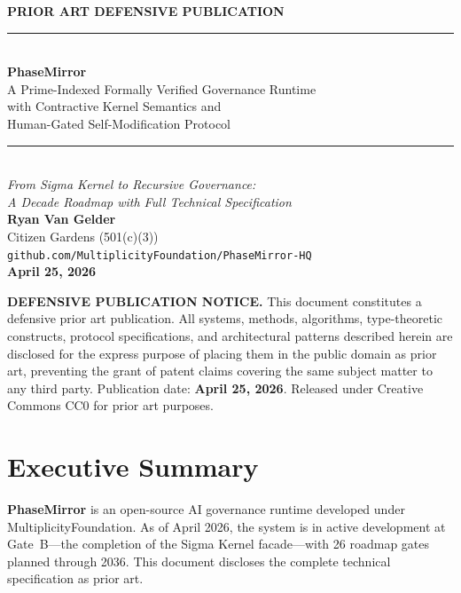 \documentclass[11pt,letterpaper]{article}
\theoremstyle{remark}
\begin{document}

\begin{titlepage}
\centering
\vspace*{1.5cm}
{\large \textbf{PRIOR ART DEFENSIVE PUBLICATION}}\\[1em]
{\rule{\linewidth}{1pt}}\\[0.8em]
{\LARGE \textbf{PhaseMirror}}\\[0.5em]
{\large A Prime-Indexed Formally Verified Governance Runtime\\
with Contractive Kernel Semantics and\\
Human-Gated Self-Modification Protocol}\\[0.8em]
{\rule{\linewidth}{0.5pt}}\\[1em]
{\normalsize \textit{From Sigma Kernel to Recursive Governance:\\
A Decade Roadmap with Full Technical Specification}}\\[2em]
{\normalsize
\textbf{Ryan Van Gelder}\\
Citizen Gardens (501(c)(3))\\
\texttt{github.com/MultiplicityFoundation/PhaseMirror-HQ}\\[0.4em]
\textbf{April 25, 2026}
}\\[2em]
\begin{mdframed}[backgroundcolor=gray!10,linecolor=black,linewidth=1pt]
\small\noindent
\textbf{DEFENSIVE PUBLICATION NOTICE.}
This document constitutes a defensive prior art publication.
All systems, methods, algorithms, type-theoretic constructs, protocol
specifications, and architectural patterns described herein are disclosed
for the express purpose of placing them in the public domain as prior art,
preventing the grant of patent claims covering the same subject matter to
any third party. Publication date: \textbf{April 25, 2026}.
Released under Creative Commons CC0 for prior art purposes.
\end{mdframed}
\end{titlepage}

\tableofcontents
\newpage

\section{Executive Summary}

\textbf{PhaseMirror} is an open-source AI governance runtime developed
under MultiplicityFoundation. As of April 2026, the system is in active
development at Gate~B---the completion of the Sigma Kernel facade---with
26 roadmap gates planned through 2036. This document discloses the
complete technical specification as prior art.
\end{document}
